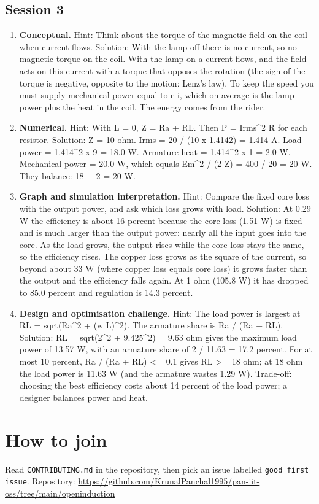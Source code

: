 \documentclass[11pt,a4paper]{article}
\begin{document}
\subsection*{Session 3}
\begin{enumerate}[nosep]
\item \textbf{Conceptual.} Hint: Think about the torque of the magnetic field on the coil when current flows. Solution: With the lamp off there is no current, so no magnetic torque on the coil. With the lamp on a current flows, and the field acts on this current with a torque that opposes the rotation (the sign of the torque is negative, opposite to the motion: Lenz's law). To keep the speed you must supply mechanical power equal to e i, which on average is the lamp power plus the heat in the coil. The energy comes from the rider.
\item \textbf{Numerical.} Hint: With L = 0, Z = Ra + RL. Then P = Irms\textasciicircum{}2 R for each resistor. Solution: Z = 10 ohm. Irms = 20 / (10 x 1.4142) = 1.414 A. Load power = 1.414\textasciicircum{}2 x 9 = 18.0 W. Armature heat = 1.414\textasciicircum{}2 x 1 = 2.0 W. Mechanical power = 20.0 W, which equals Em\textasciicircum{}2 / (2 Z) = 400 / 20 = 20 W. They balance: 18 + 2 = 20 W.
\item \textbf{Graph and simulation interpretation.} Hint: Compare the fixed core loss with the output power, and ask which loss grows with load. Solution: At 0.29 W the efficiency is about 16 percent because the core loss (1.51 W) is fixed and is much larger than the output power: nearly all the input goes into the core. As the load grows, the output rises while the core loss stays the same, so the efficiency rises. The copper loss grows as the square of the current, so beyond about 33 W (where copper loss equals core loss) it grows faster than the output and the efficiency falls again. At 1 ohm (105.8 W) it has dropped to 85.0 percent and regulation is 14.3 percent.
\item \textbf{Design and optimisation challenge.} Hint: The load power is largest at RL = sqrt(Ra\textasciicircum{}2 + (w L)\textasciicircum{}2). The armature share is Ra / (Ra + RL). Solution: RL = sqrt(2\textasciicircum{}2 + 9.425\textasciicircum{}2) = 9.63 ohm gives the maximum load power of 13.57 W, with an armature share of 2 / 11.63 = 17.2 percent. For at most 10 percent, Ra / (Ra + RL) \textless{}= 0.1 gives RL \textgreater{}= 18 ohm; at 18 ohm the load power is 11.63 W (and the armature wastes 1.29 W). Trade-off: choosing the best efficiency costs about 14 percent of the load power; a designer balances power and heat.
\end{enumerate}

\section{How to join}
Read \texttt{CONTRIBUTING.md} in the repository, then pick an issue labelled \texttt{good first issue}. Repository: \url{https://github.com/KrunalPanchal1995/pan-iit-oss/tree/main/openinduction}
\end{document}
